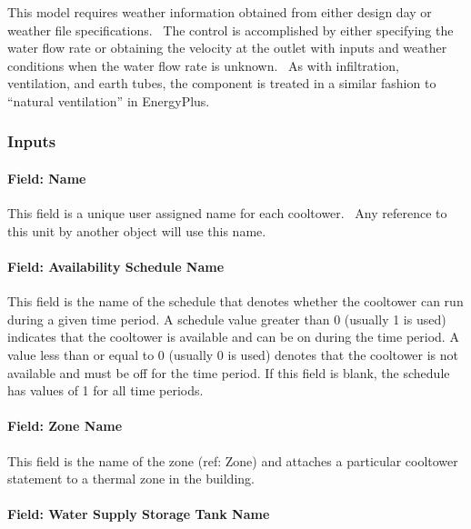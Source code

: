 This model requires weather information obtained from either design day or weather file specifications. ~The control is accomplished by either specifying the water flow rate or obtaining the velocity at the outlet with inputs and weather conditions when the water flow rate is unknown.~ As with infiltration, ventilation, and earth tubes, the component is treated in a similar fashion to ``natural ventilation'' in EnergyPlus.

\subsubsection{Inputs}\label{inputs-8-002}

\paragraph{Field: Name}\label{field-name-8-002}

This field is a unique user assigned name for each cooltower.~ Any reference to this unit by another object will use this name.

\paragraph{Field: Availability Schedule Name}\label{field-availability-schedule-name-000}

This field is the name of the schedule that denotes whether the cooltower can run during a given time period. A schedule value greater than 0 (usually 1 is used) indicates that the cooltower is available and can be on during the time period. A value less than or equal to 0 (usually 0 is used) denotes that the cooltower is not available and must be off for the time period. If this field is blank, the schedule has values of 1 for all time periods.

\paragraph{Field: Zone Name}\label{field-zone-name-6}

This field is the name of the zone (ref: Zone) and attaches a particular cooltower statement to a thermal zone in the building.

\paragraph{Field: Water Supply Storage Tank Name}\label{field-water-supply-storage-tank-name}


